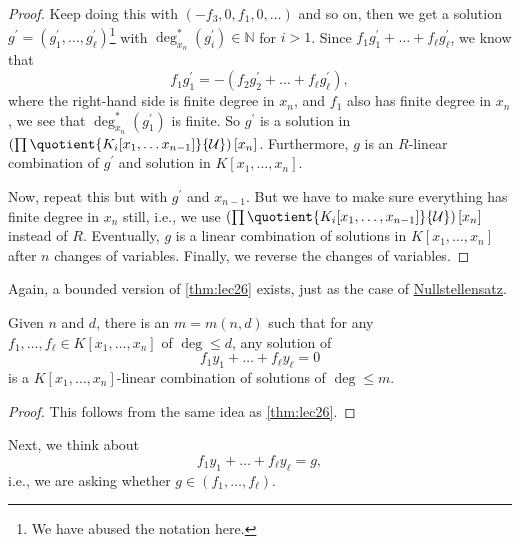 \begin{proof}
	Keep doing this with \((-f_3, 0, f_1, 0, \dots )\) and so on, then we get a solution \(g^{\prime} = (g_1^{\prime} , \dots , g_{\ell } ^{\prime} )\)\footnote{We have abused the notation here.} with \(\deg^{\ast} _{x_n}(g_i^{\prime} )\in \mathbb{N} \) for \(i > 1\). Since \(f_1 g_1^{\prime} + \dots + f_{\ell } g_{\ell }^{\prime}\), we know that
	\[
		f_1 g_1^{\prime} = -(f_2 g_2^{\prime} + \dots + f_{\ell } g_{\ell } ^{\prime} ),
	\]
	where the right-hand side is finite degree in \(x_n\), and \(f_1\) also has finite degree in \(x_n\), we see that \(\deg^{\ast} _{x_n}(g_1^{\prime} )\) is finite. So \(g^{\prime} \) is a solution in \(\left( \prod \quotient{K_i [x_1, \dots x_{n-1}] }{\mathcal{U} } \right) [x_n]\). Furthermore, \(g\) is an \(R\)-linear combination of \(g^{\prime} \) and solution in \(K[x_1, \dots , x_n]\).

	Now, repeat this but with \(g^{\prime} \) and \(x_{n-1} \). But we have to make sure everything has finite degree in \(x_n\) still, i.e., we use \(\left( \prod \quotient{K_i[x_1, \dots , x_{n-1}]}{\mathcal{U} } \right) [x_n]\) instead of \(R\). Eventually, \(g\) is a linear combination of solutions in \(K[x_1, \dots , x_n]\) after \(n\) changes of variables. Finally, we reverse the changes of variables.
\end{proof}

Again, a bounded version of \autoref{thm:lec26} exists, just as the case of \hyperref[thm:Hilbert-Nullstellensatz]{Nullstellensatz}.

\begin{theorem}
	Given \(n\) and \(d\), there is an \(m=m(n, d)\) such that for any \(f_1, \dots , f_{\ell }\in K[x_1, \dots , x_n] \) of \(\deg \leq d\), any solution of
	\[
		f_1 y_1 + \dots + f_{\ell } y_{\ell } = 0
	\]
	is a \(K[x_1, \dots , x_n]\)-linear combination of solutions of \(\deg \leq m\).
\end{theorem}
\begin{proof}
	This follows from the same idea as \autoref{thm:lec26}.
\end{proof}

Next, we think about
\[
	f_1 y_1 + \dots + f_{\ell } y_{\ell } = g,
\]
i.e., we are asking whether \(g\in (f_1, \dots , f_{\ell } )\).